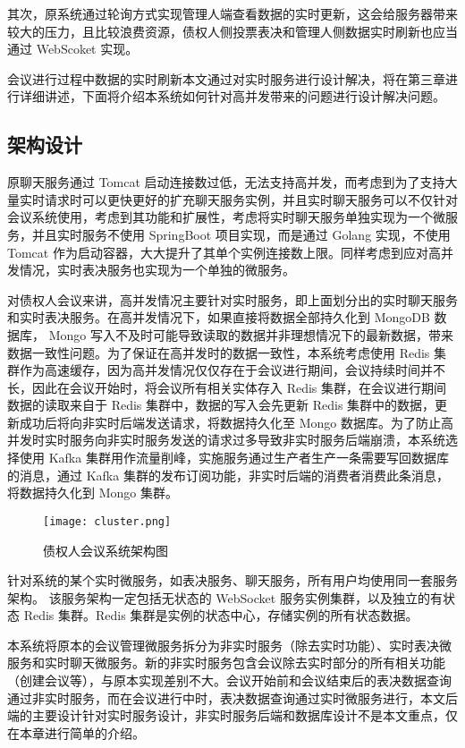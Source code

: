 其次，原系统通过轮询方式实现管理人端查看数据的实时更新，这会给服务器带来较大的压力，且比较浪费资源，债权人侧投票表决和管理人侧数据实时刷新也应当通过 WebScoket 实现。

会议进行过程中数据的实时刷新本文通过对实时服务进行设计解决，将在第三章进行详细讲述，下面将介绍本系统如何针对高并发带来的问题进行设计解决问题。

\subsection{架构设计}
原聊天服务通过 Tomcat 启动连接数过低，无法支持高并发，而考虑到为了支持大量实时请求时可以更快更好的扩充聊天服务实例，并且实时聊天服务可以不仅针对会议系统使用，考虑到其功能和扩展性，考虑将实时聊天服务单独实现为一个微服务，并且实时服务不使用 SpringBoot 项目实现，而是通过 Golang 实现，不使用 Tomcat 作为启动容器，大大提升了其单个实例连接数上限。同样考虑到应对高并发情况，实时表决服务也实现为一个单独的微服务。

对债权人会议来讲，高并发情况主要针对实时服务，即上面划分出的实时聊天服务和实时表决服务。在高并发情况下，如果直接将数据全部持久化到 MongoDB 数据库， Mongo 写入不及时可能导致读取的数据并非理想情况下的最新数据，带来数据一致性问题。为了保证在高并发时的数据一致性，本系统考虑使用 Redis 集群作为高速缓存，因为高并发情况仅仅存在于会议进行期间，会议持续时间并不长，因此在会议开始时，将会议所有相关实体存入 Redis 集群，在会议进行期间数据的读取来自于 Redis 集群中，数据的写入会先更新 Redis 集群中的数据，更新成功后将向非实时后端发送请求，将数据持久化至 Mongo 数据库。为了防止高并发时实时服务向非实时服务发送的请求过多导致非实时服务后端崩溃，本系统选择使用 Kafka 集群用作流量削峰，实施服务通过生产者生产一条需要写回数据库的消息，通过 Kafka 集群的发布订阅功能，非实时后端的消费者消费此条消息，将数据持久化到 Mongo 集群。

\begin{figure}[!htp]
  \centering
  \texttt{[image: cluster.png]}
  \caption[实时微服务架构]
    {债权人会议系统架构图}
 \label{fig:cluster}
\end{figure}

针对系统的某个实时微服务，如表决服务、聊天服务，所有用户均使用同一套服务架构。
该服务架构一定包括无状态的 WebSocket 服务实例集群，以及独立的有状态 Redis 集群。Redis 集群是实例的状态中心，存储实例的所有状态数据。

本系统将原本的会议管理微服务拆分为非实时服务（除去实时功能）、实时表决微服务和实时聊天微服务。新的非实时服务包含会议除去实时部分的所有相关功能（创建会议等），与原本实现差别不大。会议开始前和会议结束后的表决数据查询通过非实时服务，而在会议进行中时，表决数据查询通过实时微服务进行，本文后端的主要设计针对实时服务设计，非实时服务后端和数据库设计不是本文重点，仅在本章进行简单的介绍。

